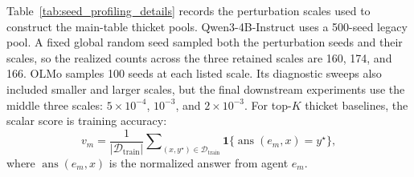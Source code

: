 Table~\ref{tab:seed_profiling_details} records the perturbation scales used to
construct the main-table thicket pools. Qwen3-4B-Instruct uses a 500-seed
legacy pool. A fixed global random seed sampled both the perturbation seeds and
their scales, so the realized counts across the three retained scales are 160,
174, and 166. OLMo samples 100 seeds at each listed scale. Its diagnostic sweeps
also included smaller and larger scales, but the final downstream experiments
use the middle three scales: $5\times 10^{-4}$, $10^{-3}$, and
$2\times 10^{-3}$.
For top-$K$ thicket baselines, the scalar score is training accuracy:
\begin{equation}
    v_m
    =
    \frac{1}{|\mathcal D_{\mathrm{train}}|}
    \sum\nolimits_{(x,y^\star)\in\mathcal D_{\mathrm{train}}}
    \mathbf 1\{\operatorname{ans}(e_m,x)=y^\star\},
    \label{eq:thicket_eval}
\end{equation}
where $\operatorname{ans}(e_m,x)$ is the normalized answer from agent $e_m$.


